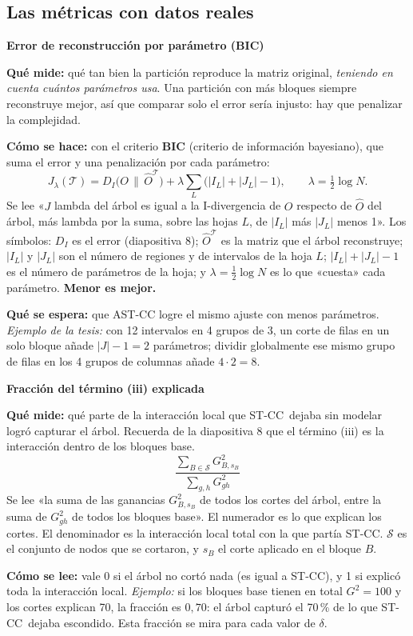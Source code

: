 \documentclass[11pt,a4paper]{article}
\newcommand{\cajainicio}[3]{\par\medskip\noindent
  \begin{lrbox}{\cajabox}\begin{minipage}{\dimexpr\linewidth-2\fboxsep-2\fboxrule\relax}%
  \textbf{\color{#1}#3}\par\smallskip}
\newcommand{\cajafin}[2]{\end{minipage}\end{lrbox}\fcolorbox{#1}{#2}{\usebox{\cajabox}}\par\medskip}
\newenvironment{nota}[1]{\cajainicio{acc}{acc!7}{#1}}{\cajafin{acc}{acc!7}}
\newcommand{\STCC}{ST-CC}
\begin{document}
\subsection*{Las métricas con datos reales}

\begin{nota}{Error de reconstrucción por parámetro (BIC)}
\textbf{Qué mide:} qué tan bien la partición reproduce la matriz original, \emph{teniendo en cuenta cuántos parámetros usa}. Una partición con más bloques siempre reconstruye mejor, así que comparar solo el error sería injusto: hay que penalizar la complejidad.

\textbf{Cómo se hace:} con el criterio \textbf{BIC} (criterio de información bayesiano), que suma el error y una penalización por cada parámetro:
\[ J_\lambda(\mathcal{T})=D_I\bigl(O\,\|\,\hat O^{\mathcal{T}}\bigr)+\lambda\sum_{L}\bigl(|I_L|+|J_L|-1\bigr),\qquad \lambda=\tfrac12\log N. \]
Se lee «$J$ lambda del árbol es igual a la I-divergencia de $O$ respecto de $\hat O$ del árbol, más lambda por la suma, sobre las hojas $L$, de $|I_L|$ más $|J_L|$ menos 1». Los símbolos: $D_I$ es el error (diapositiva 8); $\hat O^{\mathcal{T}}$ es la matriz que el árbol reconstruye; $|I_L|$ y $|J_L|$ son el número de regiones y de intervalos de la hoja $L$; $|I_L|+|J_L|-1$ es el número de parámetros de la hoja; y $\lambda=\tfrac12\log N$ es lo que «cuesta» cada parámetro. \textbf{Menor es mejor.}

\textbf{Qué se espera:} que AST-CC logre el mismo ajuste con menos parámetros. \textit{Ejemplo de la tesis:} con 12 intervalos en 4 grupos de 3, un corte de filas en un solo bloque añade $|J|-1=2$ parámetros; dividir globalmente ese mismo grupo de filas en los 4 grupos de columnas añade $4\cdot2=8$.
\end{nota}

\begin{nota}{Fracción del término (iii) explicada}
\textbf{Qué mide:} qué parte de la interacción local que \STCC\ dejaba sin modelar logró capturar el árbol. Recuerda de la diapositiva 8 que el término (iii) es la interacción dentro de los bloques base.
\[ \frac{\sum_{B\in\mathcal{S}}G^2_{B,s_B}}{\sum_{g,h}G^2_{gh}} \]
Se lee «la suma de las ganancias $G^2_{B,s_B}$ de todos los cortes del árbol, entre la suma de $G^2_{gh}$ de todos los bloques base». El numerador es lo que explican los cortes. El denominador es la interacción local total con la que partía \STCC. $\mathcal{S}$ es el conjunto de nodos que se cortaron, y $s_B$ el corte aplicado en el bloque $B$.

\textbf{Cómo se lee:} vale 0 si el árbol no cortó nada (es igual a \STCC), y 1 si explicó toda la interacción local. \textit{Ejemplo:} si los bloques base tienen en total $G^2=100$ y los cortes explican 70, la fracción es $0{,}70$: el árbol capturó el 70\,\% de lo que \STCC\ dejaba escondido. Esta fracción se mira para cada valor de $\delta$.
\end{nota}
\end{document}

